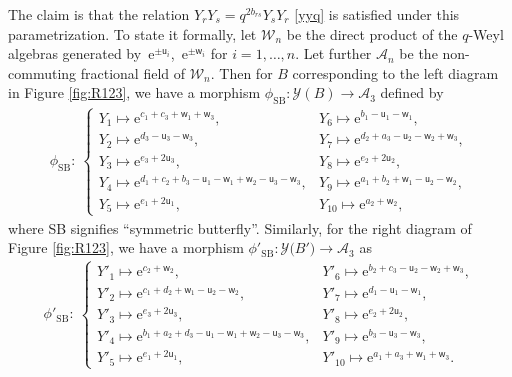 \documentclass[pdftex]{sigma}
\newcommand{\e}{{\mathrm e}}
\newcommand{\uu}{{\mathsf u}}
\newcommand{\ww}{{\mathsf w}}
\numberwithin{equation}{section}
\begin{document}
The claim is that the relation
$Y_r Y_s = q^{2b_{rs}}Y_sY_r$ \eqref{yyq} is satisfied under this parametrization.
%
To state it formally, let $\mathcal{W}_n$ be the direct product of the
$q$-Weyl algebras generated by~$\e^{\pm \uu_i}$,~$\e^{\pm \ww_i}$ for
$i=1, \dots, n$. Let further $\mathcal{A}_n$ be the non-commuting
fractional field of $\mathcal{W}_n$. Then for $B$ corresponding to
the left diagram in Figure \ref{fig:R123}, we have a morphism
$\phi_\mathrm{SB}\colon \mathcal{Y}(B) \rightarrow \mathcal{A}_3$
defined by
\begin{align}
\phi_\mathrm{SB}\colon\
\begin{cases}
Y_1 \mapsto \e^{c_1+c_3+\ww_1+\ww_3},
& Y_6 \mapsto \e^{b_1-\uu_1-\ww_1},
\\
Y_2 \mapsto \e^{d_3-\uu_3-\ww_3},
& Y_7 \mapsto \e^{d_2+a_3-\uu_2-\ww_2+\ww_3},
\\
Y_3 \mapsto \e^{e_3+2\uu_3},
& Y_8 \mapsto \e^{e_2+2\uu_2},
\\
Y_4 \mapsto \e^{d_1+c_2+b_3-\uu_1-\ww_1+\ww_2-\uu_3-\ww_3},
& Y_9 \mapsto \e^{a_1+b_2+\ww_1-\uu_2-\ww_2},
\\
Y_5 \mapsto \e^{e_1+2\uu_1},
& Y_{10} \mapsto \e^{a_2+\ww_2},
\end{cases}
\label{Yw}
\end{align}
where SB signifies ``symmetric butterfly''. Similarly, for the right
diagram of Figure \ref{fig:R123}, we have a morphism
$\phi'_\mathrm{SB}\colon \mathcal{Y}\bigl(B'\bigr) \rightarrow \mathcal{A}_3$ as
\begin{align}
\phi'_\mathrm{SB}\colon\
\begin{cases}
Y'_1 \mapsto \e^{c_2+\ww_2},
& Y'_6 \mapsto \e^{b_2+c_3-\uu_2-\ww_2+\ww_3},
\\
Y'_2 \mapsto \e^{c_1+d_2+\ww_1-\uu_2-\ww_2},
& Y'_7 \mapsto \e^{d_1-\uu_1-\ww_1},
\\
Y'_3 \mapsto \e^{e_3+2\uu_3},
& Y'_8 \mapsto \e^{e_2+2\uu_2},
\\
Y'_4 \mapsto \e^{b_1+a_2+d_3-\uu_1-\ww_1+\ww_2-\uu_3-\ww_3},
& Y'_9 \mapsto \e^{b_3-\uu_3-\ww_3},
\\
Y'_5 \mapsto \e^{e_1+2\uu_1},
& Y'_{10} \mapsto \e^{a_1+a_3+\ww_1+\ww_3}.
\end{cases}
\label{Ypw}
\end{align}
\end{document}
